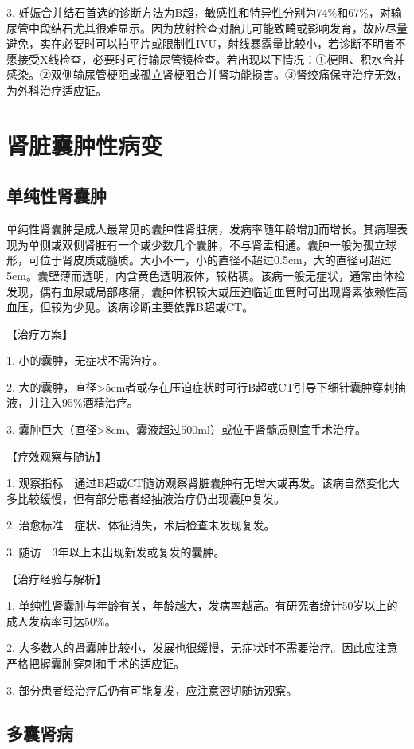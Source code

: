 3.
妊娠合并结石首选的诊断方法为B超，敏感性和特异性分别为74\%和67\%，对输尿管中段结石尤其很难显示。因为放射检查对胎儿可能致畸或影响发育，故应尽量避免，实在必要时可以拍平片或限制性IVU，射线暴露量比较小，若诊断不明者不愿接受X线检查，必要时可行输尿管镜检查。若出现以下情况：①梗阻、积水合并感染。②双侧输尿管梗阻或孤立肾梗阻合并肾功能损害。③肾绞痛保守治疗无效，为外科治疗适应证。

\section{肾脏囊肿性病变}

\subsection{单纯性肾囊肿}

单纯性肾囊肿是成人最常见的囊肿性肾脏病，发病率随年龄增加而增长。其病理表现为单侧或双侧肾脏有一个或少数几个囊肿，不与肾盂相通。囊肿一般为孤立球形，可位于肾皮质或髓质。大小不一，小的直径不超过0.5cm，大的直径可超过5cm。囊壁薄而透明，内含黄色透明液体，较粘稠。该病一般无症状，通常由体检发现，偶有血尿或局部疼痛，囊肿体积较大或压迫临近血管时可出现肾素依赖性高血压，但较为少见。该病诊断主要依靠B超或CT。

【治疗方案】

1. 小的囊肿，无症状不需治疗。

2.
大的囊肿，直径\textgreater{}5cm者或存在压迫症状时可行B超或CT引导下细针囊肿穿刺抽液，并注入95\%酒精治疗。

3.
囊肿巨大（直径\textgreater{}8cm、囊液超过500ml）或位于肾髓质则宜手术治疗。

【疗效观察与随访】

1.
观察指标　通过B超或CT随访观察肾脏囊肿有无增大或再发。该病自然变化大多比较缓慢，但有部分患者经抽液治疗仍出现囊肿复发。

2. 治愈标准　症状、体征消失，术后检查未发现复发。

3. 随访　3年以上未出现新发或复发的囊肿。

【治疗经验与解析】

1.
单纯性肾囊肿与年龄有关，年龄越大，发病率越高。有研究者统计50岁以上的成人发病率可达50\%。

2.
大多数人的肾囊肿比较小，发展也很缓慢，无症状时不需要治疗。因此应注意严格把握囊肿穿刺和手术的适应证。

3. 部分患者经治疗后仍有可能复发，应注意密切随访观察。

\subsection{多囊肾病}

